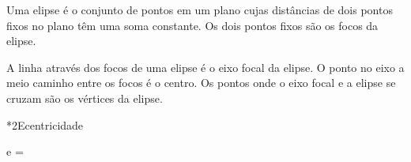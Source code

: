 \documentclass["./AM_2C-Anotacoes.tex"]{subfiles}
\begin{document}
\begin{sectionBox}
  Uma elipse é o conjunto de pontos em um plano cujas distâncias de dois pontos fixos no plano têm uma soma constante. Os dois pontos fixos são os focos da elipse.

  A linha através dos focos de uma elipse é o eixo focal da elipse. O ponto no eixo a meio caminho entre os focos é o centro. Os pontos onde o eixo focal e a elipse se cruzam são os vértices da elipse.


  \begin{sectionBox}*2{Ecentricidade}

    \vspace{-2ex}
    \begin{BM}
      e 
      = 
    \end{BM}

  \end{sectionBox}

\end{sectionBox}
\end{document}
